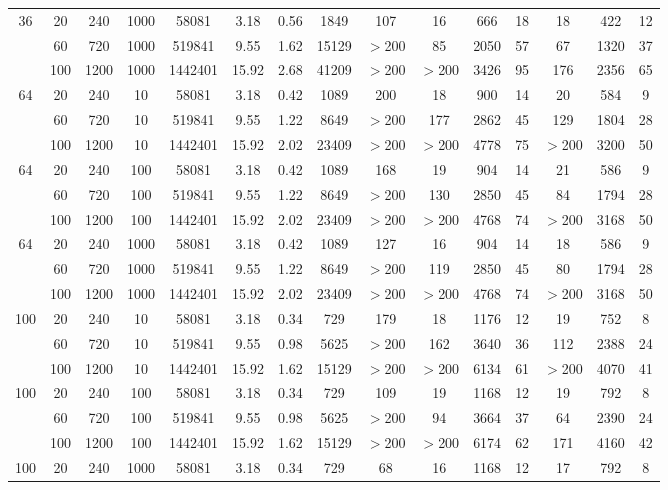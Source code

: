 \documentclass[preprint,3p,times]{elsarticle}
\theoremstyle{definition}
\numberwithin{equation}{section}
\begin{document}
{\begin{table}[H]
\begin{tabular}{cccccccc|c|ccc|ccc}
\hline
36 & 20 & 240 & 1000 & 58081 & 3.18 & 0.56 & 1849 & 107 & 16 & 666 & 18 & 18 & 422 & 12 \\
 & 60 & 720 & 1000 & 519841 &  9.55 & 1.62 & 15129 & $>$200 & 85 & 2050 & 57 & 67 & 1320 & 37 \\
 & 100 & 1200 & 1000 & 1442401 &  15.92 & 2.68 & 41209 & $>$200 & $>$200 & 3426 & 95 & 176 & 2356 & 65 \\
\hline
64 & 20 & 240 & 10 & 58081 & 3.18 & 0.42 & 1089 & 200 & 18 & 900 & 14 & 20 & 584 & 9 \\
 & 60 & 720 & 10 & 519841 &  9.55 & 1.22 & 8649 & $>$200 & 177 & 2862 & 45 & 129 & 1804 & 28 \\
 & 100 & 1200 & 10 & 1442401 &  15.92 & 2.02 & 23409 & $>$200 & $>$200 & 4778 & 75 & $>$200 & 3200 & 50 \\
\hline
64 & 20 & 240 & 100 & 58081 & 3.18 & 0.42 & 1089 & 168 & 19 & 904 & 14 & 21 & 586 & 9 \\
 & 60 & 720 & 100 & 519841 &  9.55 & 1.22 & 8649 & $>$200 & 130 & 2850 & 45 & 84 & 1794 & 28 \\
 & 100 & 1200 & 100 & 1442401 &  15.92 & 2.02 & 23409 & $>$200 & $>$200 & 4768 & 74 & $>$200 & 3168 & 50 \\
\hline
64 & 20 & 240 & 1000 & 58081 & 3.18 & 0.42 & 1089 & 127 & 16 & 904 & 14 & 18 & 586 & 9 \\
 & 60 & 720 & 1000 & 519841 &  9.55 & 1.22 & 8649 & $>$200 & 119 & 2850 & 45 & 80 & 1794 & 28 \\
 & 100 & 1200 & 1000 & 1442401 &  15.92 & 2.02 & 23409 & $>$200 & $>$200 & 4768 & 74 & $>$200 & 3168 & 50 \\
\hline
100 & 20 & 240 & 10 & 58081 & 3.18 & 0.34 & 729 & 179 & 18 & 1176 & 12 & 19 & 752 & 8 \\
 & 60 & 720 & 10 & 519841 &  9.55 & 0.98 & 5625 & $>$200 & 162 & 3640 & 36 & 112 & 2388 & 24 \\
 & 100 & 1200 & 10 & 1442401 &  15.92 & 1.62 & 15129 & $>$200 & $>$200 & 6134 & 61 & $>$200 & 4070 & 41 \\
\hline
100 & 20 & 240 & 100 & 58081 & 3.18 & 0.34 & 729 & 109 & 19 & 1168 & 12 & 19 & 792 & 8 \\
 & 60 & 720 & 100 & 519841 &  9.55 & 0.98 & 5625 & $>$200 & 94 & 3664 & 37 & 64 & 2390 & 24 \\
 & 100 & 1200 & 100 & 1442401 &  15.92 & 1.62 & 15129 & $>$200 & $>$200 & 6174 & 62 & 171 & 4160 & 42 \\
\hline
100 & 20 & 240 & 1000 & 58081 & 3.18 & 0.34 & 729 & 68 & 16 & 1168 & 12 & 17 & 792 & 8 \\

\end{tabular}
\end{table}}
\end{document}
